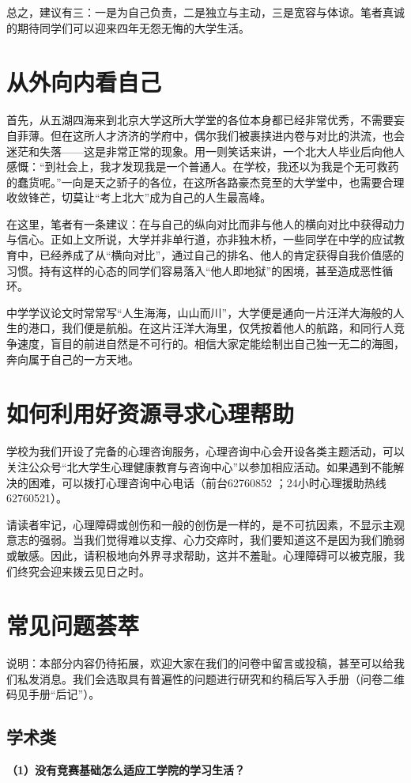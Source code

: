 \documentclass[11pt,oneside]{book}
\begin{document}
总之，建议有三：一是为自己负责，二是独立与主动，三是宽容与体谅。笔者真诚的期待同学们可以迎来四年无怨无悔的大学生活。

\section{从外向内看自己}
首先，从五湖四海来到北京大学这所大学堂的各位本身都已经非常优秀，不需要妄自菲薄。但在这所人才济济的学府中，偶尔我们被裹挟进内卷与对比的洪流，也会迷茫和失落——这是非常正常的现象。用一则笑话来讲，一个北大人毕业后向他人感慨：“到社会上，我才发现我是一个普通人。在学校，我还以为我是个无可救药的蠢货呢。”一向是天之骄子的各位，在这所各路豪杰竞至的大学堂中，也需要合理收敛锋芒，切莫让“考上北大”成为自己的人生最高峰。

在这里，笔者有一条建议：在与自己的纵向对比而非与他人的横向对比中获得动力与信心。正如上文所说，大学并非单行道，亦非独木桥，一些同学在中学的应试教育中，已经养成了从“横向对比”，通过自己的排名、他人的肯定获得自我价值感的习惯。持有这样的心态的同学们容易落入“他人即地狱”的困境，甚至造成恶性循环。

中学学议论文时常常写“人生海海，山山而川”，大学便是通向一片汪洋大海般的人生的港口，我们便是航船。在这片汪洋大海里，仅凭按着他人的航路，和同行人竞争速度，盲目的前进自然是不可行的。相信大家定能绘制出自己独一无二的海图，奔向属于自己的一方天地。

\section{如何利用好资源寻求心理帮助}
学校为我们开设了完备的心理咨询服务，心理咨询中心会开设各类主题活动，可以关注公众号“北大学生心理健康教育与咨询中心”以参加相应活动。如果遇到不能解决的困难，可以拨打心理咨询中心电话（前台62760852 ；24小时心理援助热线62760521）。

请读者牢记，心理障碍或创伤和一般的创伤是一样的，是不可抗因素，不显示主观意志的强弱。当我们觉得难以支撑、心力交瘁时，我们要知道这不是因为我们脆弱或敏感。因此，请积极地向外界寻求帮助，这并不羞耻。心理障碍可以被克服，我们终究会迎来拨云见日之时。

\section{常见问题荟萃}
说明：本部分内容仍待拓展，欢迎大家在我们的问卷中留言或投稿，甚至可以给我们私发消息。我们会选取具有普遍性的问题进行研究和约稿后写入手册（问卷二维码见手册“后记”）。
\subsection{学术类}
\textbf{（1）没有竞赛基础怎么适应工学院的学习生活？}
\end{document}
